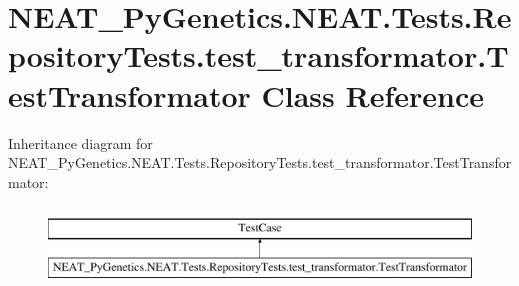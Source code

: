 \hypertarget{class_n_e_a_t___py_genetics_1_1_n_e_a_t_1_1_tests_1_1_repository_tests_1_1test__transformator_1_1_test_transformator}{}\section{N\+E\+A\+T\+\_\+\+Py\+Genetics.\+N\+E\+A\+T.\+Tests.\+Repository\+Tests.\+test\+\_\+transformator.\+Test\+Transformator Class Reference}
\label{class_n_e_a_t___py_genetics_1_1_n_e_a_t_1_1_tests_1_1_repository_tests_1_1test__transformator_1_1_test_transformator}
Inheritance diagram for N\+E\+A\+T\+\_\+\+Py\+Genetics.\+N\+E\+A\+T.\+Tests.\+Repository\+Tests.\+test\+\_\+transformator.\+Test\+Transformator\+:\begin{figure}[H]
\begin{center}
\leavevmode
\includegraphics[height=2.000000cm]{class_n_e_a_t___py_genetics_1_1_n_e_a_t_1_1_tests_1_1_repository_tests_1_1test__transformator_1_1_test_transformator}
\end{center}
\end{figure}
